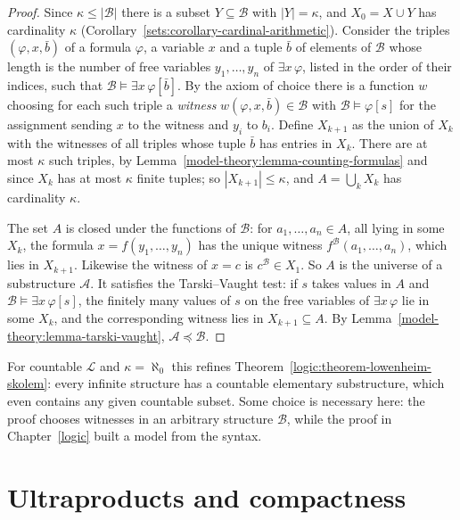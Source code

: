 \begin{proof}
Since $\kappa \leq |\mathcal{B}|$ there is a subset $Y \subseteq \mathcal{B}$ with $|Y| = \kappa$, and $X_0 = X \cup Y$ has cardinality $\kappa$
(Corollary~\ref{sets:corollary-cardinal-arithmetic}). Consider the triples $(\varphi, x, \bar{b})$ of a formula $\varphi$, a variable $x$ and a tuple $\bar{b}$
of elements of $\mathcal{B}$ whose length is the number of free variables $y_1, \ldots, y_n$ of $\exists x\,\varphi$, listed in the order of their indices, such
that $\mathcal{B} \models \exists x\,\varphi[\bar{b}]$. By the axiom of choice there is a function $w$ choosing for each such triple a \emph{witness}
$w(\varphi, x, \bar{b}) \in \mathcal{B}$ with $\mathcal{B} \models \varphi[s]$ for the assignment sending $x$ to the witness and $y_i$ to $b_i$. Define
$X_{k+1}$ as the union of $X_k$ with the witnesses of all triples whose tuple $\bar{b}$ has entries in $X_k$. There are at most $\kappa$ such triples, by
Lemma~\ref{model-theory:lemma-counting-formulas} and since $X_k$ has at most $\kappa$ finite tuples; so $|X_{k+1}| \leq \kappa$, and
$A = \bigcup_kX_k$ has cardinality $\kappa$.

The set $A$ is closed under the functions of $\mathcal{B}$: for $a_1, \ldots, a_n \in A$, all lying in some $X_k$, the formula $x = f(y_1, \ldots, y_n)$ has the
unique witness $f^{\mathcal{B}}(a_1, \ldots, a_n)$, which lies in $X_{k+1}$. Likewise the witness of $x = c$ is $c^{\mathcal{B}} \in X_1$. So $A$ is the universe
of a substructure $\mathcal{A}$. It satisfies the Tarski--Vaught test: if $s$ takes values in $A$ and $\mathcal{B} \models \exists x\,\varphi[s]$, the finitely
many values of $s$ on the free variables of $\exists x\,\varphi$ lie in some $X_k$, and the corresponding witness lies in $X_{k+1} \subseteq A$. By
Lemma~\ref{model-theory:lemma-tarski-vaught}, $\mathcal{A} \preceq \mathcal{B}$.
\end{proof}

For countable $\mathcal{L}$ and $\kappa = \aleph_0$ this refines Theorem~\ref{logic:theorem-lowenheim-skolem}: every infinite structure has a countable
elementary substructure, which even contains any given countable subset. Some choice is necessary here: the proof chooses witnesses in an arbitrary
structure $\mathcal{B}$, while the proof in Chapter~\ref{logic} built a model from the syntax.

\section{Ultraproducts and compactness}\label{model-theory:section-ultraproducts}

